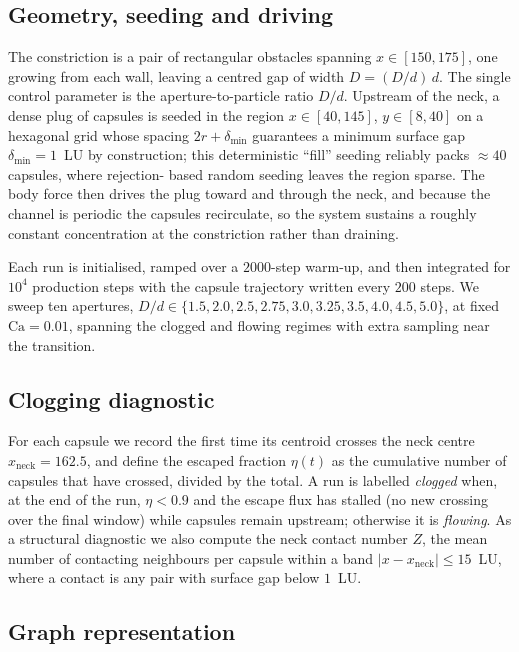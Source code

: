 \documentclass[11pt,a4paper]{article}
\begin{document}
\subsection{Geometry, seeding and driving}
\label{sec:driving}

The constriction is a pair of rectangular obstacles spanning
$x\in[150,175]$, one growing from each wall, leaving a centred gap of
width $D=(D/d)\,d$. The single control parameter is the
aperture-to-particle ratio $D/d$. Upstream of the neck, a dense plug of
capsules is seeded in the region $x\in[40,145]$, $y\in[8,40]$ on a
hexagonal grid whose spacing $2r+\delta_{\min}$ guarantees a minimum
surface gap $\delta_{\min}=1$~LU by construction; this deterministic
``fill'' seeding reliably packs $\approx 40$ capsules, where rejection-
based random seeding leaves the region sparse. The body force then
drives the plug toward and through the neck, and because the channel is
periodic the capsules recirculate, so the system sustains a roughly
constant concentration at the constriction rather than draining.

Each run is initialised, ramped over a $2000$-step warm-up, and then
integrated for $10^4$ production steps with the capsule trajectory
written every $200$ steps. We sweep ten apertures,
$D/d\in\{1.5,2.0,2.5,2.75,3.0,3.25,3.5,4.0,4.5,5.0\}$, at fixed
$\mathrm{Ca}=0.01$, spanning the clogged and flowing regimes with
extra sampling near the transition.

\subsection{Clogging diagnostic}
\label{sec:clogmetric}

For each capsule we record the first time its centroid crosses the neck
centre $x_{\mathrm{neck}}=162.5$, and define the escaped fraction
$\eta(t)$ as the cumulative number of capsules that have crossed,
divided by the total. A run is labelled \emph{clogged} when, at the end
of the run, $\eta<0.9$ and the escape flux has stalled (no new crossing
over the final window) while capsules remain upstream; otherwise it is
\emph{flowing}. As a structural diagnostic we also compute the neck
contact number $Z$, the mean number of contacting neighbours per capsule
within a band $|x-x_{\mathrm{neck}}|\le 15$~LU, where a contact is any
pair with surface gap below $1$~LU.

\subsection{Graph representation}
\label{sec:graph}
\end{document}
